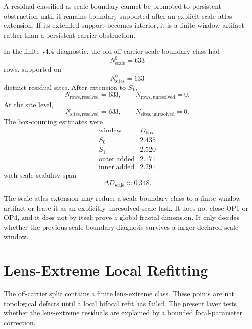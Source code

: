 \begin{proposition}
A residual classified as scale-boundary cannot be promoted to persistent
obstruction until it remains boundary-supported after an explicit scale-atlas
extension.  If its extended support becomes interior, it is a finite-window
artifact rather than a persistent carrier obstruction.
\end{proposition}

\begin{remark}
In the finite v4.4 diagnostic, the old off-carrier scale-boundary class had
\[
    N_{\mathrm{scale}}^{0}=633
\]
rows, supported on
\[
    N_{\mathrm{sites}}^{0}=633
\]
distinct residual sites.  After extension to \(S_1\),
\[
    N_{\mathrm{rows,resolved}}=633,
    \qquad
    N_{\mathrm{rows,unresolved}}=0.
\]
At the site level,
\[
    N_{\mathrm{sites,resolved}}=633,
    \qquad
    N_{\mathrm{sites,unresolved}}=0.
\]
The box-counting estimates were
\[
\begin{array}{c|c}
\text{window} & D_{\mathrm{box}}\\
\hline
S_0 & 2.435\\
S_1 & 2.520\\
\text{outer added} & 2.171\\
\text{inner added} & 2.291
\end{array}
\]
with scale-stability span
\[
    \Delta D_{\mathrm{scale}}\approx 0.348.
\]
\end{remark}

\begin{theorem}
The scale atlas extension may reduce a scale-boundary class to a finite-window
artifact or leave it as an explicitly unresolved scale task.  It does not close
OP1 or OP4, and it does not by itself prove a global fractal dimension.  It
only decides whether the previous scale-boundary diagnosis survives a larger
declared scale window.
\end{theorem}



\section{Lens-Extreme Local Refitting}
\label{sec:lens-extreme-local-refitting}

The off-carrier split contains a finite lens-extreme class.  These points are
not topological defects until a local bifocal refit has failed.  The present
layer tests whether the lens-extreme residuals are explained by a bounded
focal-parameter correction.


